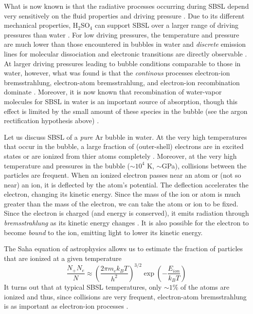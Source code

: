 \documentclass[11pt,prb,aps,nofootinbib,superscriptaddress,floatfix]{revtex4-2}
\begin{document}
What is now known is that the radiative processes occurring during SBSL depend very sensitively on the fluid properties and driving pressure \cite{flannigan2006measurement,flannigan2005plasma}. Due to its different mechanical properties, H$_2$SO$_4$ can support SBSL over a larger range of driving pressures than water \cite{an2009diagnosing}. For low driving pressures, the temperature and pressure are much lower than those encountered in bubbles in water and \emph{discrete} emission lines for molecular dissociation and electronic transitions are directly observable \cite{flannigan2005plasma,flannigan2006measurement}. At larger driving pressures leading to bubble conditions comparable to those in water, however, what was found is that the \emph{continous} processes electron-ion bremsstrahlung, electron-atom bremsstrahlung, and electron-ion recombination dominate \cite{hilgenfeldt1999simple,yasui2018acoustic,suslick2008inside,zel2002physics}. Moreover, it is now known that recombination of water-vapor molecules for SBSL in water is an important source of absorption, though this effect is limited by the small amount of these species in the bubble (see the argon rectification hypothesis above) \cite{an2006mechanism}. 

Let us discuss SBSL of a \emph{pure} Ar bubble in water. At the very high temperatures that occur in the bubble, a large fraction of (outer-shell) electrons are in excited states or are ionized from thier atoms completely \cite{zel2002physics}. Moreover, at the very high temperature and pressures in the bubble ($\sim 10^4$ K, $\sim$GPa), collisions between the particles are frequent. When an ionized electron passes near an atom or (not so near) an ion, it is deflected by the atom's potential. The deflection accelerates the electron, changing its kinetic energy. Since the mass of the ion or atom is much greater than the mass of the electron, we can take the atom or ion to be fixed. Since the electron is charged (and energy is conserved), it emits radiation through \emph{bremsstrahlung} as its kinetic energy changes \cite{jackson1999classical,zel2002physics}. It is also possible for the electron to become \emph{bound} to the ion, emitting light to lower its kinetic energy.

The Saha equation of astrophysics allows us to estimate the fraction of particles that are ionized at a given temperature \cite{hilgenfeldt1999simple,an2006mechanism,zel2002physics}
\begin{equation}
    \frac{N_+ N_e}{N} \approx \left( \frac{2 \pi m_e k_B T}{h^2} \right)^{3/2} \exp \left(-\frac{E_{ion}}{ k_B T} \right)
    \label{eq:saha}
\end{equation}
It turns out that at typical SBSL temperatures, only $\sim 1\%$ of the atoms are ionized and thus, since collisions are very frequent, electron-atom bremsstrahlung is as important as electron-ion processes \cite{hilgenfeldt1999simple,an2006mechanism,flannigan2005plasma}. 
\end{document}
